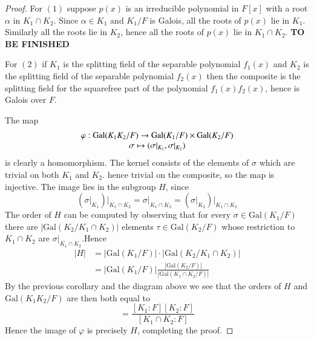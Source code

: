 \begin{proof}
    For $(1)$ suppose $p(x)$ is an irreducible polynomial in $F[x]$ with a root $\alpha$ in $K_1\cap K_2$. Since $\alpha \in K_1$ and $K_1/F$ is Galois, all the roots of $p(x)$ lie in $K_1$. Similarly all the roots lie in $K_2$, hence all the roots of $p(x)$ lie in $K_1\cap K_2$. \textbf{TO BE FINISHED}

    For $(2)$ if $K_1$ is the splitting field of the separable polynomial $f_1(x)$ and $K_2$ is the splitting field of the separable polynomial $f_2(x)$ then the composite is the splitting field for the squarefree part of the polynomial $f_1(x)f_2(x)$, hence is Galois over $F$.

    The map \begin{equation*}
        \begin{array}{c} \varphi:\text{Gal}(K_1K_2/F)\rightarrow \text{Gal}(K_1/F)\times \text{Gal}(K_2/F) \\ \sigma \mapsto (\sigma\vert_{K_1},\sigma\vert_{K_2}) \end{array}
    \end{equation*}
    is clearly a homomorphism. The kernel consists of the elements of $\sigma$ which are trivial on both $K_1$ and $K_2$. hence trivial on the composite, so the map is injective. The image lies in the subgroup $H$, since \begin{equation*}
        (\sigma\vert_{K_1})\vert_{K_1\cap K_2} = \sigma\vert_{K_1\cap K_2} = (\sigma\vert_{K_2})\vert_{K_1\cap K_2}
    \end{equation*}
    The order of $H$ can be computed by observing that for every $\sigma \in \text{Gal}(K_1/F)$ there are $|\text{Gal}(K_2/K_1\cap K_2)|$ elements $\tau \in \text{Gal}(K_2/F)$ whose restriction to $K_1\cap K_2$ are $\sigma\vert_{K_1\cap K_2}$.Hence \begin{align*}
        |H| &= |\text{Gal}(K_1/F)|\cdot|\text{Gal}(K_2/K_1\cap K_2)| \\
        &= |\text{Gal}(K_1/F)|\frac{|\text{Gal}(K_2/F)|}{|\text{Gal}(K_1\cap K_2/F)|}
    \end{align*}
    By the previous corollary and the diagram above we see that the orders of $H$ and $\text{Gal}(K_1K_2/F)$ are then both equal to \begin{equation*}
        [K_1K_2:F] = \frac{[K_1:F][K_2:F]}{[K_1\cap K_2:F]}
    \end{equation*}
    Hence the image of $\varphi$ is precisely $H$, completing the proof.
\end{proof}


